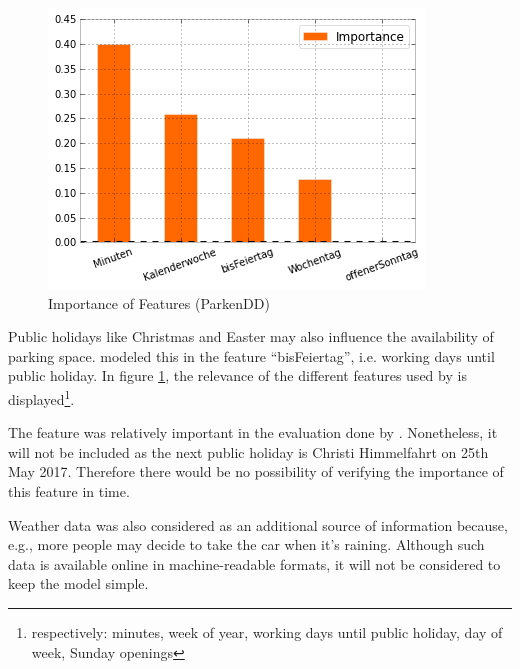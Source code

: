 \begin{figure}
  \centering
  \includegraphics[scale=0.5]{parkendd-Feature-Importance.png}
  \caption{Importance of Features (ParkenDD)}
  \label{fig:parkendd_features}
\end{figure}

Public holidays like Christmas and Easter may also influence the availability of parking space. \cite{parkendd} modeled this in the feature ``bisFeiertag'', i.e. working days until public holiday. In figure \ref{fig:parkendd_features}, the relevance of the different features used by \cite{parkendd} is displayed\footnote{respectively: minutes, week of year, working days until public holiday, day of week, Sunday openings}. 

The feature was relatively important in the evaluation done by \cite{parkendd}. Nonetheless, it will not be included as the next public holiday is Christi Himmelfahrt on 25th May 2017. Therefore there would be no possibility of verifying the importance of this feature in time.

Weather data was also considered as an additional source of information because, e.g., more people may decide to take the car when it's raining. Although such data is available online in machine-readable formats, it will not be considered to keep the model simple.